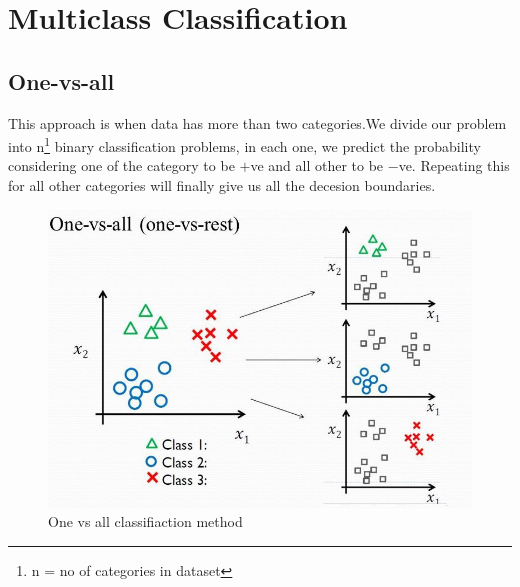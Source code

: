 \documentclass[12pt]{report}
\begin{document}
\section{Multiclass Classification}
  \subsection{One-vs-all}
    This approach is when data has more than two categories.We divide our problem into n\footnote[1]{n = no of categories in dataset} binary classification problems, in each one, we predict the probability considering one of the category to be $+$ve and all other to be $-$ve. Repeating this for all other categories will finally give us all the decesion boundaries.
    \begin{figure}[h]
      \centering
      \includegraphics[scale = 0.3]{oneall.png}
      \caption{One vs all classifiaction method}
    \end{figure}    
\end{document}
